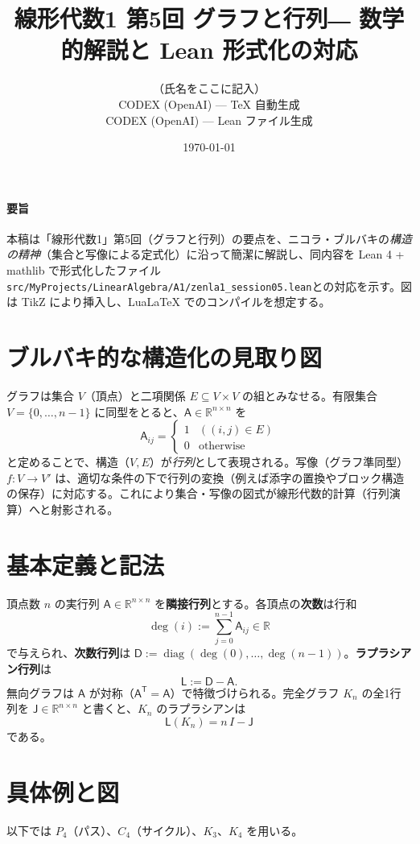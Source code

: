 \documentclass[12pt]{ltjsarticle}
\title{線形代数1 第5回\; グラフと行列\;― 数学的解説と Lean 形式化の対応}
\author{（氏名をここに記入） \\ CODEX (OpenAI) — TeX 自動生成 \\ CODEX (OpenAI) — Lean ファイル生成}
\date{\today}
\DeclareMathOperator{\diag}{diag}
\newcommand{\1}{\mathbf{1}}
\newcommand{\R}{\mathbb{R}}
\newcommand{\A}{\mathsf{A}}
\newcommand{\D}{\mathsf{D}}
\newcommand{\Lapl}{\mathsf{L}}
\newcommand{\J}{\mathsf{J}}
\begin{document}
\maketitle

\paragraph{要旨}
本稿は「線形代数1」第5回（グラフと行列）の要点を、ニコラ・ブルバキの\textit{構造の精神}（集合と写像による定式化）に沿って簡潔に解説し、同内容を Lean 4 + mathlib で形式化したファイル\texttt{src/MyProjects/LinearAlgebra/A1/zenla1\_session05.lean}との対応を示す。図は TikZ により挿入し、LuaLaTeX でのコンパイルを想定する。

\section{ブルバキ的な構造化の見取り図}
グラフは集合 $V$（頂点）と二項関係 $E\subseteq V\times V$ の組とみなせる。有限集合 $V=\{0,\dots,n-1\}$ に同型をとると、$\A\in\R^{n\times n}$ を
\[
  \A_{ij} = \begin{cases}
    1 & ((i,j)\in E)\\
    0 & \text{otherwise}
  \end{cases}
\]
と定めることで、構造（$V,E$）が\textit{行列}として表現される。写像（グラフ準同型）$f:V\to V'$ は、適切な条件の下で行列の変換（例えば添字の置換やブロック構造の保存）に対応する。これにより集合・写像の図式が線形代数的計算（行列演算）へと射影される。

\section{基本定義と記法}
頂点数 $n$ の実行列 $\A\in\R^{n\times n}$ を\textbf{隣接行列}とする。各頂点の\textbf{次数}は行和
\[
  \deg(i) := \sum_{j=0}^{n-1} \A_{ij} \in \R
\]
で与えられ、\textbf{次数行列}は $\D := \diag(\deg(0),\dots,\deg(n-1))$。\textbf{ラプラシアン行列}は
\[
  \Lapl := \D - \A.
\]
無向グラフは $\A$ が対称（$\A^{\mathsf{T}}=\A$）で特徴づけられる。完全グラフ $K_n$ の全1行列を $\J\in\R^{n\times n}$ と書くと、$K_n$ のラプラシアンは
\[
  \Lapl(K_n) = n\,I - \J
\]
である。

\section{具体例と図}
以下では $P_4$（パス）、$C_4$（サイクル）、$K_3$、$K_4$ を用いる。
\end{document}

